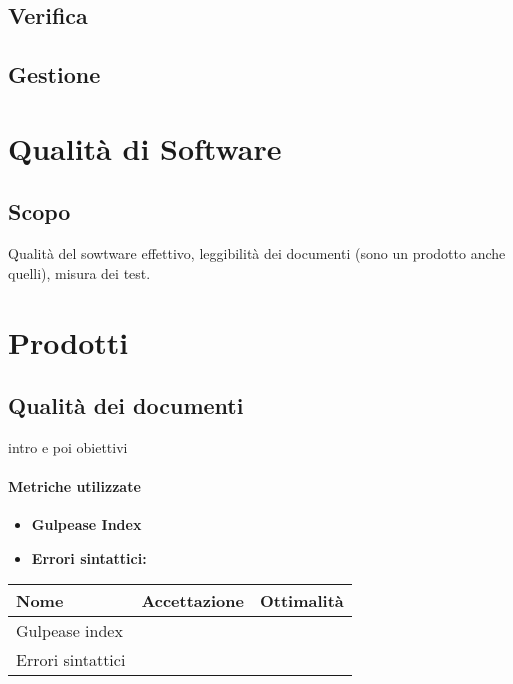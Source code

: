 \subsection{Verifica}
\subsection{Gestione}

\section{Qualità di Software}
\subsection{Scopo}
Qualità del sowtware effettivo, leggibilità dei documenti (sono un prodotto anche quelli), misura dei test.

\section{Prodotti}
\subsection{Qualità dei documenti}
intro e poi obiettivi
\paragraph{Metriche utilizzate}
\begin{itemize}
	\item{\textbf{Gulpease Index}}
	\item{\textbf{Errori sintattici: }}
\end{itemize}

\begin{table}[!htpb]
	\begin{tabular}{lll}
		\hline
		\rowcolor[HTML]{34CDF9} 
		{\color[HTML]{333333} \textbf{Nome}}    & {\color[HTML]{333333} \textbf{Accettazione}} & {\color[HTML]{333333} \textbf{Ottimalità}} \\ \hline
		\multicolumn{1}{|l|}{Gulpease index}    & \multicolumn{1}{l|}{}                        & \multicolumn{1}{l|}{}                      \\ \hline
		\multicolumn{1}{|l|}{Errori sintattici} & \multicolumn{1}{l|}{}                        & \multicolumn{1}{l|}{}                      \\ \hline
	\end{tabular}
\end{table}
